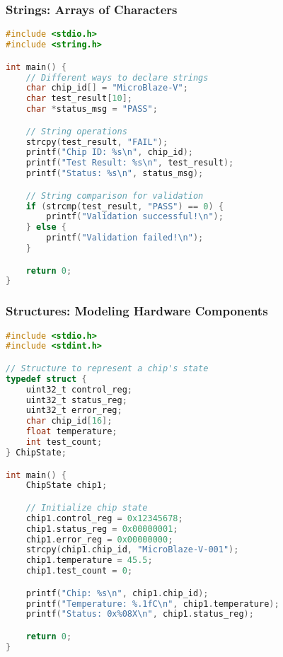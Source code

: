 \documentclass{beamer}
\begin{document}
\begin{frame}[fragile]
\frametitle{Strings: Arrays of Characters}
\begin{lstlisting}[language=C, basicstyle=\fontsize{6}{6}\selectfont\ttfamily]
#include <stdio.h>
#include <string.h>

int main() {
    // Different ways to declare strings
    char chip_id[] = "MicroBlaze-V";
    char test_result[10];
    char *status_msg = "PASS";

    // String operations
    strcpy(test_result, "FAIL");
    printf("Chip ID: %s\n", chip_id);
    printf("Test Result: %s\n", test_result);
    printf("Status: %s\n", status_msg);

    // String comparison for validation
    if (strcmp(test_result, "PASS") == 0) {
        printf("Validation successful!\n");
    } else {
        printf("Validation failed!\n");
    }

    return 0;
}
\end{lstlisting}
\end{frame}

\begin{frame}[fragile]
\frametitle{Structures: Modeling Hardware Components}
\begin{lstlisting}[language=C, basicstyle=\fontsize{6}{6}\selectfont\ttfamily]
#include <stdio.h>
#include <stdint.h>

// Structure to represent a chip's state
typedef struct {
    uint32_t control_reg;
    uint32_t status_reg;
    uint32_t error_reg;
    char chip_id[16];
    float temperature;
    int test_count;
} ChipState;

int main() {
    ChipState chip1;

    // Initialize chip state
    chip1.control_reg = 0x12345678;
    chip1.status_reg = 0x00000001;
    chip1.error_reg = 0x00000000;
    strcpy(chip1.chip_id, "MicroBlaze-V-001");
    chip1.temperature = 45.5;
    chip1.test_count = 0;

    printf("Chip: %s\n", chip1.chip_id);
    printf("Temperature: %.1fC\n", chip1.temperature);
    printf("Status: 0x%08X\n", chip1.status_reg);

    return 0;
}
\end{lstlisting}
\end{frame}
\end{document}
